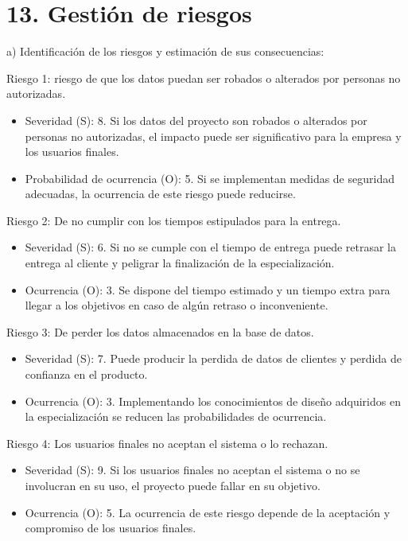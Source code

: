 \documentclass[
11pt, %
]{charter}
\begin{document}
\section{13. Gestión de riesgos}
\label{sec:riesgos}

a) Identificación de los riesgos y estimación de sus consecuencias:
 
Riesgo 1: riesgo de que los datos puedan ser robados o alterados por personas no autorizadas.
\begin{itemize}
	\item Severidad (S): 8. Si los datos del proyecto son robados o alterados por personas no autorizadas, el impacto puede ser significativo para la empresa y los usuarios finales.
	\item Probabilidad de ocurrencia (O): 5. Si se implementan medidas de seguridad adecuadas, la ocurrencia de este riesgo puede reducirse. 
\end{itemize}   

Riesgo 2: De no cumplir con los tiempos estipulados para la entrega. 
\begin{itemize}
	\item Severidad (S): 6. Si no se cumple con el tiempo de entrega puede retrasar la entrega al cliente y peligrar la finalización de la especialización. 
	\item Ocurrencia (O): 3. Se dispone del tiempo estimado y un tiempo extra para llegar a los objetivos en caso de algún retraso o inconveniente. 
\end{itemize}

Riesgo 3: De perder los datos almacenados en la base de datos.
\begin{itemize}
	\item Severidad (S): 7. Puede producir la perdida de datos de clientes y perdida de confianza en el producto.
	\item Ocurrencia (O): 3. Implementando los conocimientos de diseño adquiridos en la especialización se reducen las probabilidades de ocurrencia. 
\end{itemize}

Riesgo 4: Los usuarios finales no aceptan el sistema o lo rechazan. 
\begin{itemize}
	\item Severidad (S): 9. Si los usuarios finales no aceptan el sistema o no se involucran en su uso, el proyecto puede fallar en su objetivo.
	\item Ocurrencia (O): 5. La ocurrencia de este riesgo depende de la aceptación y compromiso de los usuarios finales.
\end{itemize}
\end{document}
